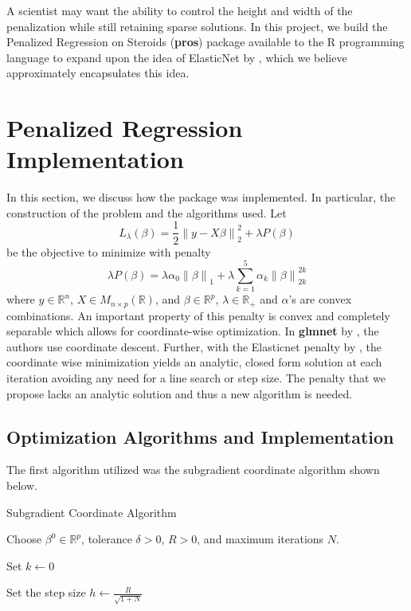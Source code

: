 \documentclass[article]{jss}
\numberwithin{equation}{section}
\newcommand{\norm}[1]{\left\lVert#1\right\rVert}
\newcommand{\R}{\mathbb{R}}
\begin{document}
A scientist may want the ability to control the height and width of the penalization while still retaining sparse solutions.
In this project, we build the Penalized Regression on Steroids (\textbf{pros}) package available to the R programming language to expand upon the idea of ElasticNet by \cite{elasticnet}, which we believe approximately encapsulates this idea.

\section{Penalized Regression Implementation}

In this section, we discuss how the package was implemented. In particular, the construction of the problem and the algorithms used.
Let
\[
L_{\lambda}(\beta) = \frac{1}{2} \norm{y - X \beta}_2^2 + \lambda P(\beta)
\]
be the objective to minimize with penalty
\[
\lambda P(\beta) = \lambda \alpha_0 \norm{\beta}_1 + \lambda \sum_{k = 1}^{5} \alpha_k \norm{\beta}_{2k}^{2k} 
\]
where $y \in \R^n$, $X \in M_{n \times p}(\R)$, and $\beta \in \R^p$, $\lambda \in \R_{+}$ and $\alpha$'s are convex combinations.
An important property of this penalty is convex and completely separable which allows for coordinate-wise optimization.
In \textbf{glmnet} by \cite{glmnet}, the authors use coordinate descent.
Further, with the Elasticnet penalty by \cite{elasticnet}, the coordinate wise minimization yields an analytic, closed form solution at each iteration avoiding any need for a line search or step size.
The penalty that we propose lacks an analytic solution and thus a new algorithm is needed.

\subsection{Optimization Algorithms and Implementation}

The first algorithm utilized was the subgradient coordinate algorithm shown below.

\vspace{.2cm}
\begin{algorithm}[H]
\caption{Subgradient Coordinate Algorithm}
Choose $\beta^0 \in \R^p$, tolerance $\delta > 0$, $R > 0$, and maximum iterations $N$.

Set $k \gets 0$

Set the step size $h \gets \frac{R}{\sqrt{1 + N}}$


\end{algorithm}
\vspace{.2cm}
\end{document}
